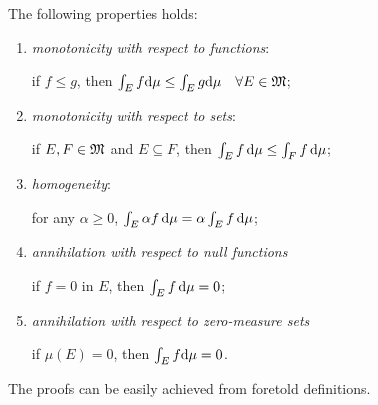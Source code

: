 \begin{prop}
	The following properties holds:
	\begin{enumerate}
		\item \emph{monotonicity with respect to functions}: 
			\begin{center}
				if $f \le g$, then $\int_E f \mathrm d\mu \le \int_E g \mathrm d\mu \quad \forall E \in \mathfrak M$;
			\end{center}
		\item \emph{monotonicity with respect to sets}: 
			\begin{center}
				if $E,F \in \mathfrak M$ and $E \subseteq F$, then $\int_E f \, \mathrm d\mu \le \int_F f \, \mathrm d\mu$;
			\end{center}
		\item \emph{homogeneity}: 
			\begin{center}
				for any $\alpha\ge 0$, $\int_E \alpha f \, \mathrm d\mu  = \alpha\int_E f \, \mathrm d\mu$;
			\end{center}
		\item \emph{annihilation with respect to null functions}
			\begin{center}
				if $f=0$ in $E$, then $\int_E f \, \mathrm d\mu = 0$;
			\end{center}
		\item \emph{annihilation with respect to zero-measure sets}
		 	\begin{center}
		 		if $\mu(E) = 0$, then $\int_E f \mathrm d\mu = 0$.
		 	\end{center}
	\end{enumerate}
\end{prop}

The proofs can be easily achieved from foretold definitions. 
